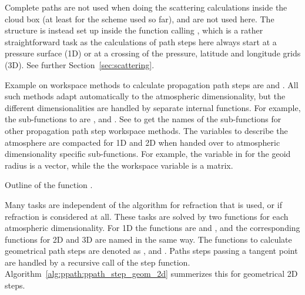 
Complete paths are not used when doing the scattering calculations
inside the cloud box (at least for the scheme used so far), and
 are not used here. The structure
 is instead set up inside the function calling
, which is a rather straightforward task
as the calculations of path steps here always start at a pressure
surface (1D) or at a crossing of the pressure, latitude and longitude
grids (3D). See further Section~\ref{sec:scattering}.



Example on workspace methods to calculate propagation path steps are
 and
. All such methods adapt
automatically to the atmospheric dimensionality, but the different
dimensionalities are handled by separate internal functions. For
example, the sub-functions to  are
, 
and . See  to
get the names of the sub-functions for other propagation path step
workspace methods. The variables to describe the atmosphere are
compacted for 1D and 2D when handed over to atmospheric dimensionality
specific sub-functions. For example, the variable in
 for the geoid radius is a vector,
while the the workspace variable is a matrix.

\begin{algorithm}[!t]
 \begin{algorithmic}
  \ENDIF
  \ENDIF
 \end{algorithmic}
 \caption{Outline of the function .}
 \label{alg:ppath:ppath_step_geom_2d}
\end{algorithm}

Many tasks are independent of the algorithm for refraction that is
used, or if refraction is considered at all. These tasks are solved by
two functions for each atmospheric dimensionality. For 1D the
functions are  and
, and the corresponding functions for 2D and
3D are named in the same way. The functions to calculate geometrical
path steps are denoted as ,
 and . Paths
steps passing a tangent point are handled by a recursive call of the
step function. Algorithm~\ref{alg:ppath:ppath_step_geom_2d} summerizes
this for geometrical 2D steps.


